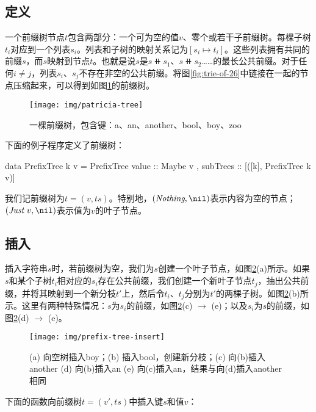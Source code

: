 \documentclass[b5paper]{ctexart}
\begin{document}
\subsection{定义}
一个前缀树节点$t$包含两部分：一个可为空的值$v$、零个或若干子前缀树。每棵子树$t_i$对应到一个列表$s_i$。列表和子树的映射关系记为$[s_i \mapsto t_i]$。这些列表拥有共同的前缀$s$，而$s$映射到节点$t$。也就是说$s$是$s \doubleplus s_1$、$s \doubleplus s_2$……的最长公共前缀。对于任何$i \neq j$，列表$s_i$、$s_j$不存在非空的公共前缀。将图\ref{fig:trie-of-26}中链接在一起的节点压缩起来，可以得到如图\ref{fig:patricia-tree}的前缀树。

\begin{figure}[htbp]
  \centering
  \texttt{[image: img/patricia-tree]}
  \caption{一棵前缀树，包含键：a、an、another、bool、boy、zoo}
  \label{fig:patricia-tree}
\end{figure}

下面的例子程序定义了前缀树：

\begin{Haskell}
data PrefixTree k v = PrefixTree { value :: Maybe v
                                 , subTrees :: [([k], PrefixTree k v)]}
\end{Haskell}

我们记前缀树为$t = (v, ts)$。特别地，$(\textit{Nothing}, \nil)$表示内容为空的节点；$(\textit{Just}\ v, \nil)$表示值为$v$的叶子节点。

\subsection{插入}

插入字符串$s$时，若前缀树为空，我们为$s$创建一个叶子节点，如图\ref{fig:patricia-insert}(a)所示。如果$s$和某个子树$t_i$相对应的$s_i$存在公共前缀，我们创建一个新叶子节点$t_j$，抽出公共前缀，并将其映射到一个新分枝$t'$上，然后令$t_i$、$t_j$分别为$t'$的两棵子树。如图\ref{fig:patricia-insert}(b)所示。这里有两种特殊情况：$s$为$s_i$的前缀，如图\ref{fig:patricia-insert}(c) $\to$ (e)；以及$s_i$为$s$的前缀，如图\ref{fig:patricia-insert}(d) $\to$ (e)。

\begin{figure}[htbp]
  \centering
  \texttt{[image: img/prefix-tree-insert]}
  \caption{(a) 向空树插入boy；(b) 插入bool，创建新分枝；(c) 向(b)插入another (d) 向(b)插入an (e) 向(c)插入an，结果与向(d)插入another相同}
  \label{fig:patricia-insert}
\end{figure}

下面的函数向前缀树$t = (v', ts)$中插入键$s$和值$v$：
\end{document}
